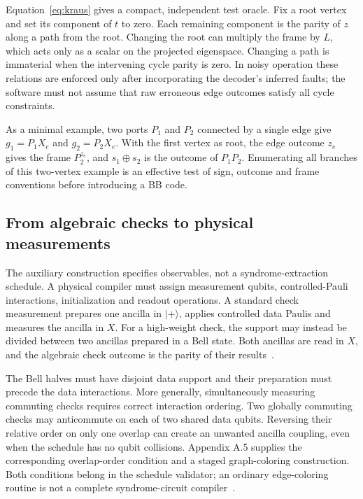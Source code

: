 \documentclass[11pt,a4paper]{article}
\begin{document}
Equation~\eqref{eq:kraus} gives a compact, independent test oracle. Fix a root vertex and set its component of $t$ to zero. Each remaining component is the parity of $z$ along a path from the root. Changing the root can multiply the frame by $L$, which acts only as a scalar on the projected eigenspace. Changing a path is immaterial when the intervening cycle parity is zero. In noisy operation these relations are enforced only after incorporating the decoder's inferred faults; the software must not assume that raw erroneous edge outcomes satisfy all cycle constraints.

As a minimal example, two ports $P_1$ and $P_2$ connected by a single edge give $g_1=P_1X_e$ and $g_2=P_2X_e$. With the first vertex as root, the edge outcome $z_e$ gives the frame $P_2^{z_e}$, and $s_1\oplus s_2$ is the outcome of $P_1P_2$. Enumerating all branches of this two-vertex example is an effective test of sign, outcome and frame conventions before introducing a BB code.

\subsection{From algebraic checks to physical measurements}

The auxiliary construction specifies observables, not a syndrome-extraction schedule. A physical compiler must assign measurement qubits, controlled-Pauli interactions, initialization and readout operations. A standard check measurement prepares one ancilla in $\lvert+\rangle$, applies controlled data Paulis and measures the ancilla in $X$. For a high-weight check, the support may instead be divided between two ancillas prepared in a Bell state. Both ancillas are read in $X$, and the algebraic check outcome is the parity of their results~\cite{tdg}.

The Bell halves must have disjoint data support and their preparation must precede the data interactions. More generally, simultaneously measuring commuting checks requires correct interaction ordering. Two globally commuting checks may anticommute on each of two shared data qubits. Reversing their relative order on only one overlap can create an unwanted ancilla coupling, even when the schedule has no qubit collisions. Appendix A.5 supplies the corresponding overlap-order condition and a staged graph-coloring construction. Both conditions belong in the schedule validator; an ordinary edge-coloring routine is not a complete syndrome-circuit compiler~\cite{tdg}.
\end{document}

